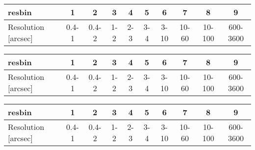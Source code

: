 \documentclass[sfheadings,a4paper,times,9pt,floats,floatfix]{article}
\begin{document}
\begin{landscape}
 \begin{table}[H]
  \begin{tabular}{|lccccccccc|}\hline
  resbin & 1 & 2 & 3 & 4 & 5 & 6 & 7 & 8 & 9 \\\hline
  Resolution [arcsec] & 0.4-1 & 0.4-2 & 1-2 & 2-3 & 3-4 & 3-10 & 10-60 & 10-100 & 600-3600 \\\hline
  \end{tabular}
 \end{table}

\end{landscape}
\begin{landscape}
 \begin{table}[H]
  \begin{tabular}{|lccccccccc|}\hline
  resbin & 1 & 2 & 3 & 4 & 5 & 6 & 7 & 8 & 9 \\\hline
  Resolution [arcsec] & 0.4-1 & 0.4-2 & 1-2 & 2-3 & 3-4 & 3-10 & 10-60 & 10-100 & 600-3600 \\\hline
  \end{tabular}
 \end{table}
 
\end{landscape}


\begin{landscape}
 \begin{table}[H]
  \begin{tabular}{|lccccccccc|}\hline
  resbin & 1 & 2 & 3 & 4 & 5 & 6 & 7 & 8 & 9 \\\hline
  Resolution [arcsec] & 0.4-1 & 0.4-2 & 1-2 & 2-3 & 3-4 & 3-10 & 10-60 & 10-100 & 600-3600 \\\hline
  \end{tabular}
 \end{table}
 
\end{landscape}

% 
% 
% 
% 
% 
% 
% 
% 
\end{document}

